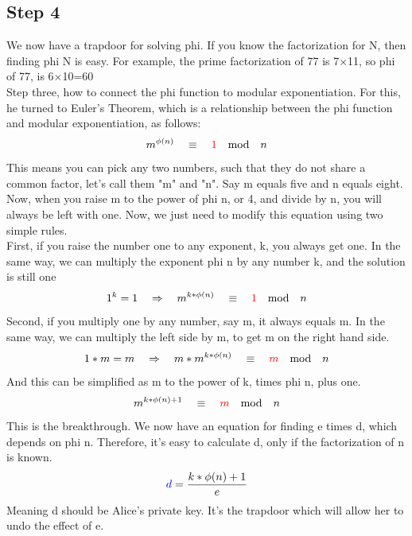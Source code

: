 \documentclass{report}
\begin{document}
\subsection{Step 4}
We now have a trapdoor for solving phi. If you know the factorization for N, then finding phi N is easy. For example, the prime factorization of 77 is 7×11, so phi of 77, is 6×10=60 \\
Step three, how to connect the phi function to modular exponentiation. For this, he turned to Euler's Theorem, which is a relationship between the phi function and modular exponentiation, as follows: 
$$m^{\phi(n)} \quad \equiv \quad \textcolor{red}{1}\quad \text{mod}\quad n$$
 This means you can pick any two numbers, such that they do not share a common factor, let's call them "m" and "n". Say m equals five and n equals eight. Now, when you raise m to the power of phi n, or 4, and divide by n, you will always be left with one.
 Now, we just need to modify this equation using two simple rules.\\
First, if you raise the number one to any exponent, k, you always get one. In the same way, we can multiply the exponent phi n by any number k, and the solution is still one
$$1^k=1 \quad \Rightarrow \quad m^{k*\phi(n)} \quad \equiv \quad \textcolor{red}{1}\quad \text{mod}\quad n$$
Second, if you multiply one by any number, say m, it always equals m. In the same way, we can multiply the left side by m, to get m on the right hand side.
$$1*m=m \quad \Rightarrow \quad m*m^{k*\phi(n)} \quad \equiv \quad \textcolor{red}{m}\quad \text{mod}\quad n$$
 And this can be simplified as m to the power of k, times phi n, plus one.
$$ m^{k*\phi(n)+1} \quad \equiv \quad \textcolor{red}{m}\quad \text{mod}\quad n$$
 This is the breakthrough. We now have an equation for finding e times d, which depends on phi n. Therefore, it's easy to calculate d, only if the factorization of n is known.
$$\textcolor{blue}{d}=\dfrac{k*\phi(n)+1}{e}$$
 Meaning d should be Alice's private key. It's the trapdoor which will allow her to undo the effect of e.
\end{document}
